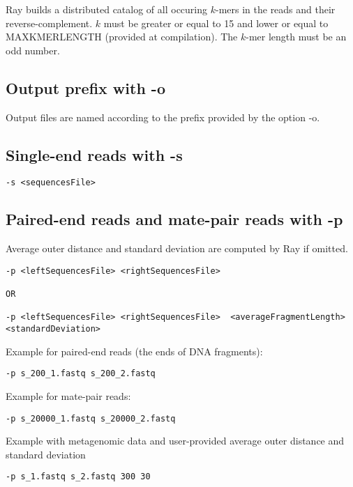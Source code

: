 \documentclass{article}
\begin{document}
Ray builds a distributed catalog of all occuring $k$-mers in the reads and their reverse-complement. $k$ must be greater or equal to 15 and lower or equal to MAXKMERLENGTH (provided at compilation). The $k$-mer length must be an odd number.

\subsection{Output prefix with -o}

Output files are named according to the prefix provided by the option -o.

\subsection{Single-end reads with -s}

\begin{verbatim}
-s <sequencesFile>
\end{verbatim}

\subsection{Paired-end reads and mate-pair reads with -p}

Average outer distance and standard deviation are computed by Ray if omitted.

\begin{verbatim}
-p <leftSequencesFile> <rightSequencesFile>  

OR

-p <leftSequencesFile> <rightSequencesFile>  <averageFragmentLength> <standardDeviation> 
\end{verbatim}

Example for paired-end reads (the ends of DNA fragments):

\begin{verbatim}
-p s_200_1.fastq s_200_2.fastq
\end{verbatim}

Example for mate-pair reads:

\begin{verbatim}
-p s_20000_1.fastq s_20000_2.fastq
\end{verbatim}

Example with metagenomic data and user-provided average outer distance and standard deviation

\begin{verbatim}
-p s_1.fastq s_2.fastq 300 30
\end{verbatim}
\end{document}
